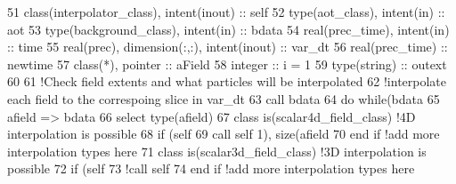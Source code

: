 \begin{DoxyCode}
51     \textcolor{keywordtype}{class}(interpolator\_class), \textcolor{keywordtype}{intent(inout)} :: self
52     \textcolor{keywordtype}{type}(aot\_class), \textcolor{keywordtype}{intent(in)} :: aot
53     \textcolor{keywordtype}{type}(background\_class), \textcolor{keywordtype}{intent(in)} :: bdata
54     \textcolor{keywordtype}{real(prec\_time)}, \textcolor{keywordtype}{intent(in)} :: time
55     \textcolor{keywordtype}{real(prec)}, \textcolor{keywordtype}{dimension(:,:)}, \textcolor{keywordtype}{intent(inout)} :: var\_dt
56     \textcolor{keywordtype}{real(prec\_time)} :: newtime
57     \textcolor{keywordtype}{class}(*), \textcolor{keywordtype}{pointer} :: aField
58     \textcolor{keywordtype}{integer} :: i = 1
59     \textcolor{keywordtype}{type}(string) :: outext
60 
61     \textcolor{comment}{!Check field extents and what particles will be interpolated}
62     \textcolor{comment}{!interpolate each field to the correspoing slice in var\_dt}
63     \textcolor{keyword}{call }bdata%
64     \textcolor{keywordflow}{do} \textcolor{keywordflow}{while}(bdata%
65         afield => bdata%
66         \textcolor{keywordflow}{select type}(afield)
67 \textcolor{keywordflow}{        class is}(scalar4d\_field\_class)          \textcolor{comment}{!4D interpolation is possible}
68             \textcolor{keywordflow}{if} (self%
69                 \textcolor{keyword}{call }self%
      1), \textcolor{keyword}{size}(afield%
70 \textcolor{keywordflow}{            end if} \textcolor{comment}{!add more interpolation types here}
71 \textcolor{keywordflow}{        class is}(scalar3d\_field\_class)          \textcolor{comment}{!3D interpolation is possible}
72             \textcolor{keywordflow}{if} (self%
73                 \textcolor{comment}{!call self%
74 \textcolor{keywordflow}{            end if} \textcolor{comment}{!add more interpolation types here}
}
\end{DoxyCode}
